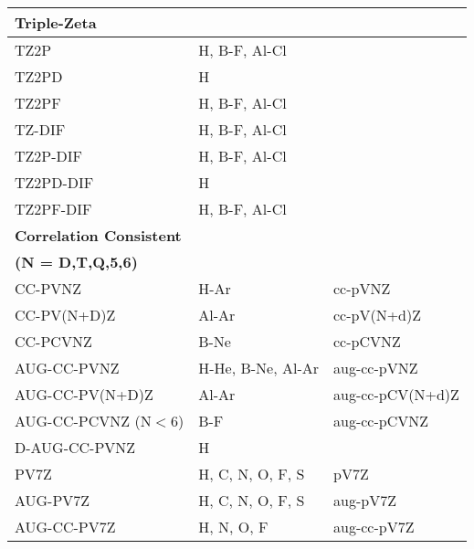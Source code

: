 \begin{table}[tbp]
\begin{center}
\begin{tabular}{|l|l|l|}
\hline
\hline
\textbf{Triple-Zeta} 			&				&\\	
\hline
	TZ2P			& H, B-F, Al-Cl		&\\
	TZ2PD			& H				&\\
	TZ2PF			& H, B-F, Al-Cl		&\\
	TZ-DIF			& H, B-F, Al-Cl		&\\ 	
	TZ2P-DIF		& H, B-F, Al-Cl		&\\
	TZ2PD-DIF		& H				&\\
	TZ2PF-DIF		& H, B-F, Al-Cl		&\\		
\hline
\hline
\textbf{Correlation Consistent}		&			&\\
\textbf{ (N = D,T,Q,5,6)}	&			&	\\
\hline
	CC-PVNZ			& H-Ar			&cc-pVNZ\\
	CC-PV(N+D)Z		& Al-Ar			&cc-pV(N+d)Z\\
        CC-PCVNZ                & B-Ne                  &cc-pCVNZ\\
	AUG-CC-PVNZ		& H-He, B-Ne, Al-Ar	&aug-cc-pVNZ\\
	AUG-CC-PV(N+D)Z		& Al-Ar			&aug-cc-pCV(N+d)Z\\
	AUG-CC-PCVNZ (N$<$6)	& B-F			&aug-cc-pCVNZ\\
	D-AUG-CC-PVNZ		& H			&\\
	PV7Z			& H, C, N, O, F, S	&pV7Z\\
	AUG-PV7Z		& H, C, N, O, F, S	&aug-pV7Z\\
	AUG-CC-PV7Z             & H, N, O, F            &aug-cc-pV7Z\\
\hline
\end{tabular}
\end{center}
\end{table}

